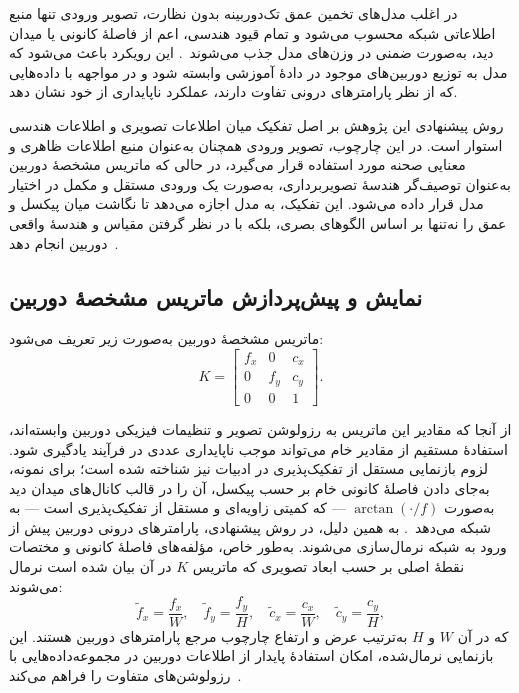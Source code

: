در اغلب مدل‌های تخمین عمق تک‌دوربینه بدون نظارت، تصویر ورودی تنها منبع اطلاعاتی شبکه محسوب می‌شود و تمام قیود هندسی، اعم از فاصلهٔ کانونی یا میدان دید، به‌صورت ضمنی در وزن‌های مدل جذب می‌شوند~\cite{Zhou2017Unsupervised,Godard2019Digging}. این رویکرد باعث می‌شود که مدل به توزیع دوربین‌های موجود در دادهٔ آموزشی وابسته شود و در مواجهه با داده‌هایی که از نظر پارامترهای درونی تفاوت دارند، عملکرد ناپایداری از خود نشان دهد.

روش پیشنهادی این پژوهش بر اصل تفکیک میان اطلاعات تصویری و اطلاعات هندسی استوار است. در این چارچوب، تصویر ورودی همچنان به‌عنوان منبع اطلاعات ظاهری و معنایی صحنه مورد استفاده قرار می‌گیرد، در حالی که ماتریس مشخصهٔ دوربین به‌عنوان توصیف‌گر هندسهٔ تصویربرداری، به‌صورت یک ورودی مستقل و مکمل در اختیار مدل قرار داده می‌شود. این تفکیک، به مدل اجازه می‌دهد تا نگاشت میان پیکسل و عمق را نه‌تنها بر اساس الگوهای بصری، بلکه با در نظر گرفتن مقیاس و هندسهٔ واقعی دوربین   انجام دهد~\cite{Facil2019CAMConvs,Yin2023Metric3D}.

\subsection{نمایش و پیش‌پردازش ماتریس مشخصهٔ دوربین}

ماتریس مشخصهٔ دوربین به‌صورت زیر تعریف می‌شود:
\begin{equation}
K =
\begin{bmatrix}
f_x & 0   & c_x \\
0   & f_y & c_y \\
0   & 0   & 1
\end{bmatrix}.
\end{equation}

از آنجا که مقادیر این ماتریس به رزولوشن تصویر و تنظیمات فیزیکی دوربین وابسته‌اند، استفادهٔ مستقیم از مقادیر خام می‌تواند موجب ناپایداری عددی در فرآیند یادگیری شود. لزوم بازنمایی مستقل از تفکیک‌پذیری در ادبیات نیز شناخته شده است؛ برای نمونه،  به‌جای دادن فاصلهٔ کانونی خام بر حسب پیکسل، آن را در قالب کانال‌های میدان دید به‌صورت $\arctan(\cdot/f)$ --- که کمیتی زاویه‌ای و مستقل از تفکیک‌پذیری است --- به شبکه می‌دهد~\cite{Facil2019CAMConvs}. به همین دلیل، در روش پیشنهادی، پارامترهای درونی دوربین پیش از ورود به شبکه نرمال‌سازی می‌شوند. به‌طور خاص، مؤلفه‌های فاصلهٔ کانونی و مختصات نقطهٔ اصلی بر حسب ابعاد تصویری که ماتریس $K$ در آن بیان شده است نرمال می‌شوند:
\begin{equation}
\tilde{f}_x = \frac{f_x}{W}, \quad
\tilde{f}_y = \frac{f_y}{H}, \quad
\tilde{c}_x = \frac{c_x}{W}, \quad
\tilde{c}_y = \frac{c_y}{H},
\end{equation}
که در آن $W$ و $H$ به‌ترتیب عرض و ارتفاع چارچوب مرجع پارامترهای دوربین هستند. این بازنمایی نرمال‌شده، امکان استفادهٔ پایدار از اطلاعات دوربین در مجموعه‌داده‌هایی با رزولوشن‌های متفاوت را فراهم می‌کند~\cite{Facil2019CAMConvs,Piccinelli2024UniDepth}.

